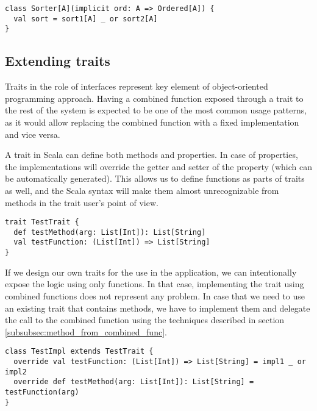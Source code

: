 \lstset{style=Scala}
\begin{lstlisting}
class Sorter[A](implicit ord: A => Ordered[A]) {
  val sort = sort1[A] _ or sort2[A]
}
\end{lstlisting}

\subsection{Extending traits}
Traits in the role of interfaces represent key element of object-oriented programming approach. Having a combined function exposed through a trait to the rest of the system is expected to be one of the most common usage patterns, as it would allow replacing the combined function with a fixed implementation and vice versa.

A trait in Scala can define both methods and properties. In case of properties, the implementations will override the getter and setter of the property (which can be automatically generated). This allows us to define functions as parts of traits as well, and the Scala syntax will make them almost unrecognizable from methods in the trait user's point of view.

\lstset{style=Scala}
\begin{lstlisting}
trait TestTrait {
  def testMethod(arg: List[Int]): List[String]
  val testFunction: (List[Int]) => List[String]
}
\end{lstlisting}

If we design our own traits for the use in the application, we can intentionally expose the logic using only functions. In that case, implementing the trait using combined functions does not represent any problem. In case that we need to use an existing trait that contains methods, we have to implement them and delegate the call to the combined function using the techniques described in section \ref{subsubsec:method_from_combined_func}.

\lstset{style=Scala}
\begin{lstlisting}
class TestImpl extends TestTrait {
  override val testFunction: (List[Int]) => List[String] = impl1 _ or impl2
  override def testMethod(arg: List[Int]): List[String] = testFunction(arg)
}
\end{lstlisting}



